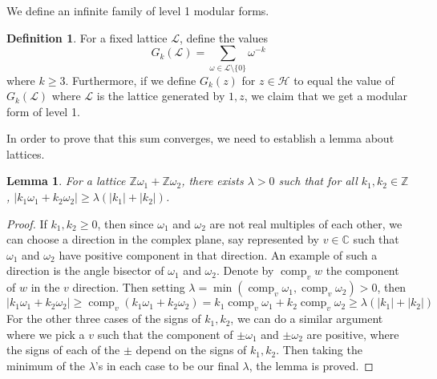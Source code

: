 \documentclass{article}
\newtheorem{lemma}[theorem]{Lemma}
\theoremstyle{definition}
\newtheorem{definition}{Definition}[section]
\theoremstyle{definition}
\theoremstyle{definition}
\newcommand{\C}{\mathbb{C}}
\newcommand{\Z}{\mathbb{Z}}
\begin{document}
We define an infinite family of level 1 modular forms.


\begin{definition}
    For a fixed lattice $\mathcal L$, define the values 
    $$G_k(\mathcal L)=\sum_{\omega\in\mathcal L\setminus\{0\}}\omega^{-k}$$
    where $k\geq3$.  Furthermore, if we define $G_k(z)$ for $z\in\mathcal H$ to equal the value of $G_k(\mathcal L)$ where $\mathcal L$ is the lattice generated by $1,z$, we claim that we get a modular form of level 1.
\end{definition} 

In order to prove that this sum converges, we need to establish a lemma about lattices.
\begin{lemma}
    For a lattice $\Z\omega_1+\Z\omega_2$, there exists $\lambda>0$ such that for all $k_1,k_2\in\Z$, $|k_1\omega_1+k_2\omega_2|\geq\lambda(|k_1|+|k_2|)$.
\end{lemma}
\begin{proof}
    If $k_1,k_2\geq0$, then since $\omega_1$ and $\omega_2$ are not real multiples of each other, we can choose a direction in the complex plane, say represented by $v\in\C$ such that $\omega_1$ and $\omega_2$ have positive component in that direction. An example of such a direction is the angle bisector of $\omega_1$ and $\omega_2$. Denote by $\operatorname{comp}_vw$ the component of $w$ in the $v$ direction. Then setting $\lambda=\min(\operatorname{comp}_v\omega_1,\operatorname{comp}_v\omega_2)>0$, then
    $$\left|k_1\omega_1+k_2\omega_2\right|\geq \operatorname{comp}_v(k_1\omega_1+k_2\omega_2)=k_1\operatorname{comp}_v\omega_1+k_2\operatorname{comp}_v\omega_2\geq\lambda(|k_1|+|k_2|)$$
    For the other three cases of the signs of $k_1,k_2$, we can do a similar argument where we pick a $v$ such that the component of $\pm\omega_1$ and $\pm\omega_2$ are positive, where the signs of each of the $\pm$ depend on the signs of $k_1,k_2$. Then taking the minimum of the $\lambda$'s in each case to be our final $\lambda$, the lemma is proved.
\end{proof}
\end{document}
